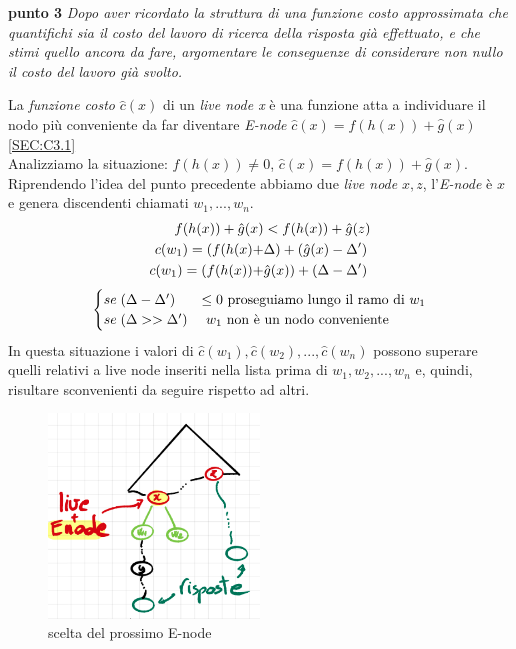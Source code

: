 \documentclass[a4paper]{article}
\begin{document}
\textbf{punto 3}
\emph{Dopo aver ricordato la struttura di una funzione costo approssimata che quantifichi sia il costo del lavoro di ricerca della risposta già effettuato, e che stimi quello ancora da fare, argomentare le conseguenze di considerare non nullo il costo del lavoro già svolto.}
\begin{adjustwidth}{.8cm}{0cm}
	La \textit{funzione costo} $\hat c(x)$ di un \textit{live node x} è una funzione atta a individuare il nodo più conveniente da far diventare \textit{E-node} $\hat c(x) = f(h(x)) + \hat g(x)$ \ref{SEC:C3.1}\\
Analizziamo la situazione: $f(h(x)) \neq 0$, $\hat c(x) = f(h(x)) + \hat g(x)$.\\
Riprendendo l'idea del punto precedente abbiamo due \textit{live node} $x,z$, l'\textit{E-node} è $x$ e genera discendenti chiamati $w_1,..., w_n$.
\begin{align}        
	f(h(x)) + \hat g(x) &< f(h(x)) + \hat g(z) \notag \\
	c(w_1) = (f(h(x) + &\Delta) + (\hat g(x) - \Delta') \notag \\
	c(w_1) = (f(h(x)) + &\hat g(x)) + (\Delta - \Delta') \notag
	\end{align}
	\begin{equation}
	\begin{cases}
		se \; (\Delta - \Delta') &\leq 0 \text{ proseguiamo lungo il ramo di $w_1$} \notag \\
		se \; (\Delta >> \Delta') &\text{ $w_1$ non è un nodo conveniente} \notag
	\end{cases}
	\end{equation}
In questa situazione i valori di $\hat c(w_1), \hat c(w_2), . . . , \hat c(w_n)$ possono superare quelli relativi a live node inseriti nella lista prima di $w_1, w_2, . . . , w_n$ e, quindi, risultare sconvenienti da seguire rispetto ad altri.\\
\begin{figure}[!ht]
\centering
\includegraphics[width=0.5\textwidth]{./img/C3_next.png}
\caption{scelta del prossimo E-node} \label{FIG:C3_next2}
\end{figure}\\
\end{adjustwidth}
\end{document}
